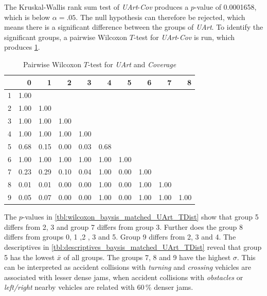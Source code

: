 The Kruskal-Wallis rank sum test of \textit{UArt}-\textit{Cov} produces a $p$-value of 0.0001658, which is below $\alpha=.05$. The null hypothesis can therefore be rejected, which means there is a significant difference between the groups of \textit{UArt}. To identify the significant groups, a pairwise Wilcoxon $T$-test for \textit{UArt}-\textit{Cov} is run, which produces \cref{tbl:wilcoxon_baysis_matched_UArt_Cov}.
\begin{table}[ht]
	\small
	\centering
	\begin{tabular}{rrrrrrrrrr}
		\toprule
		& 0 & 1 & 2 & 3 & 4 & 5 & 6 & 7 & 8 \\ 
		\midrule
		1 & 1.00 &  &  &  &  &  &  &  &  \\ 
		2 & 1.00 & 1.00 &  &  &  &  &  &  &  \\ 
		3 & 1.00 & 1.00 & 1.00 &  &  &  &  &  &  \\ 
		4 & 1.00 & 1.00 & 1.00 & 1.00 &  &  &  &  &  \\ 
		5 & 0.68 & 0.15 & 0.00 & 0.03 & 0.68 &  &  &  &  \\ 
		6 & 1.00 & 1.00 & 1.00 & 1.00 & 1.00 & 1.00 &  &  &  \\ 
		7 & 0.23 & 0.29 & 0.10 & 0.04 & 1.00 & 0.00 & 1.00 &  &  \\ 
		8 & 0.01 & 0.01 & 0.00 & 0.00 & 1.00 & 0.00 & 1.00 & 1.00 &  \\ 
		9 & 0.05 & 0.07 & 0.00 & 0.00 & 1.00 & 0.00 & 1.00 & 1.00 & 1.00 \\ 
		\bottomrule
	\end{tabular}
	\caption{Pairwise Wilcoxon $T$-test for \textit{UArt} and \textit{Coverage}}
	\label{tbl:wilcoxon_baysis_matched_UArt_Cov}
\end{table}
The $p$-values in \cref{tbl:wilcoxon_baysis_matched_UArt_TDist} show that group 5 differs from 2, 3 and group 7 differs from group 3. Further does the group 8 differs from groups 0, 1 ,2 , 3 and 5. Group 9 differs from 2, 3 and 4. The descriptives in \cref{tbl:descriptives_baysis_matched_UArt_TDist} reveal that group 5 has the lowest $\bar{x}$ of all groups. The groups 7, 8 and 9 have the highest $\sigma$. This can be interpreted as accident collisions with \textit{turning} and \textit{crossing} vehicles are associated with lesser dense jams, when accident collisions with \textit{obstacles} or \textit{left/right} nearby vehicles are related with 60\,\% denser jams.
